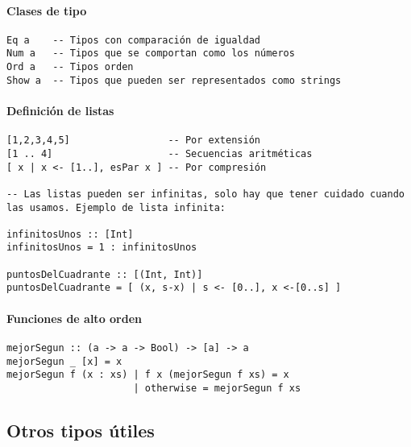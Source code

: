 \paragraph{Clases de tipo}
\begin{centrado}
	\begin{verbatim}
Eq a    -- Tipos con comparación de igualdad
Num a   -- Tipos que se comportan como los números
Ord a   -- Tipos orden
Show a  -- Tipos que pueden ser representados como strings
	\end{verbatim}
\end{centrado}

\paragraph{Definición de listas}
\begin{centrado}
	\begin{verbatim}
[1,2,3,4,5]                 -- Por extensión
[1 .. 4]                    -- Secuencias aritméticas
[ x | x <- [1..], esPar x ] -- Por compresión

-- Las listas pueden ser infinitas, solo hay que tener cuidado cuando las usamos. Ejemplo de lista infinita:
	
infinitosUnos :: [Int]
infinitosUnos = 1 : infinitosUnos

puntosDelCuadrante :: [(Int, Int)]
puntosDelCuadrante = [ (x, s-x) | s <- [0..], x <-[0..s] ]
	\end{verbatim}
\end{centrado}

\paragraph{Funciones de alto orden}
\begin{centrado}
	\begin{verbatim}
mejorSegun :: (a -> a -> Bool) -> [a] -> a
mejorSegun _ [x] = x
mejorSegun f (x : xs) | f x (mejorSegun f xs) = x
                      | otherwise = mejorSegun f xs
\end{verbatim}
\end{centrado}

\subsection{Otros tipos útiles}
